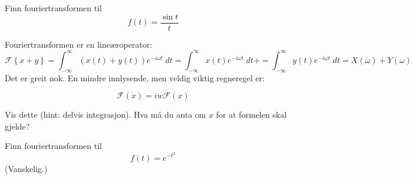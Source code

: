 \begin{oppgave}{5}
Finn fouriertransformen til 
\[
f(t)=\frac{\sin t}{t}
\]
\end{oppgave}



Fouriertransformen er en lineæroperator: 
\[
\mathcal{F}\left\{ x+y \right\}=\int_{-\infty}^{\infty} \left(x(t)+y(t)\right)e^{-i\omega t}\;dt=\int_{-\infty}^{\infty} x(t)e^{-i\omega t}\;dt+=\int_{-\infty}^{\infty} y(t)e^{-i\omega t}\;dt=X(\omega) +Y(\omega) 
\]
Det er greit nok. 
En mindre innlysende, 
men veldig viktig regneregel er:

\begin{tcolorbox}
\[
\mathcal{F}(\dot{x})=iw\mathcal{F}(x)
\]
\end{tcolorbox}

\begin{oppgave}{6}
Vis dette (hint: delvis integrasjon). Hva må du anta om $x$ for at formelen skal gjelde? 
\end{oppgave}


\begin{oppgave}{7}
Finn fouriertransformen til
\[
f(t)=e^{-t^2}
\]
(Vanskelig.)
\end{oppgave}
%




